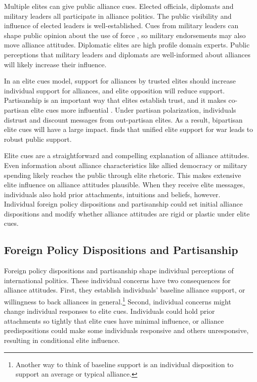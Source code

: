 \documentclass[12pt]{article}
\begin{document}
Multiple elites can give public alliance cues.
Elected officials, diplomats and military leaders all participate in alliance politics.
The public visibility and influence of elected leaders is well-established.  
Cues from military leaders can shape public opinion about the use of force \citep{Golbyetal2018}, so military endorsements may also move alliance attitudes. 
Diplomatic elites are high profile domain experts. 
Public perceptions that military leaders and diplomats are well-informed about alliances will likely increase their influence. 


In an elite cues model, support for alliances by trusted elites should increase individual support for alliances, and elite opposition will reduce support.   
Partisanship is an important way that elites establish trust, and it makes co-partisan elite cues more influential \citep{Druckmanetal2013}.
Under partisan polarization, individuals distrust and discount messages from out-partisan elites. 
As a result, bipartisan elite cues will have a large impact.
\citet{Berinsky2007} finds that unified elite support for war leads to robust public support. 


Elite cues are a straightforward and compelling explanation of alliance attitudes.
Even information about alliance characteristics like allied democracy or military spending likely reaches the public through elite rhetoric. 
This makes extensive elite influence on alliance attitudes plausible. 
When they receive elite messages, individuals also hold prior attachments, intuitions and beliefs, however.
Individual foreign policy dispositions and partisanship could set initial alliance dispositions and modify whether alliance attitudes are rigid or plastic under elite cues. 


\subsection{Foreign Policy Dispositions and Partisanship}


Foreign policy dispositions and partisanship shape individual perceptions of international politics. 
These individual concerns have two consequences for alliance attitudes. 
First, they establish individuals' baseline alliance support, or willingness to back alliances in general.\footnote{Another way to think of baseline support is an individual disposition to support an average or typical alliance.} 
Second, individual concerns might change individual responses to elite cues. 
Individuals could hold prior attachments so tightly that elite cues have minimal influence, or alliance predispositions could make some individuals responsive and others unresponsive, resulting in conditional elite influence.
\end{document}
